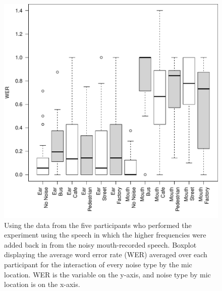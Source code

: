 \documentclass[dissertation,copyright]{uathesis}
\makeatletter
\def\maxwidth{ %
  \ifdim\Gin@nat@width>\linewidth
    \linewidth
  \else
    \Gin@nat@width
  \fi
}
\makeatother
\begin{document}

\begin{figure}[h!]%

\includegraphics[width=\maxwidth]{figure/F0_boxplot_noiseXmic-1} 

\caption{Using the data from the five participants who performed the experiment using the speech in which the higher frequencies were added back in from the noisy mouth-recorded speech.  Boxplot displaying the average word error rate (WER) averaged over each participant for the interaction of every noise type by the mic location. WER is the variable on the y-axis, and noise type by mic location is on the x-axis.}
\label{fig:F0_noiseXmic_boxplot}
\end{figure}
\end{document}
